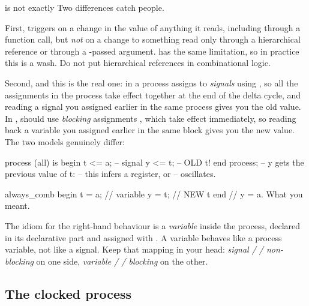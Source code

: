 \begin{gotcha}{ is not exactly }
Two differences catch people.

First,  triggers on a change in the value of anything it
reads, including through a function call, but \emph{not} on a change to
something read only through a hierarchical reference or through a
-passed argument.  has the same limitation, so in
practice this is a wash. Do not put hierarchical references in combinational
logic.

Second, and this is the real one: in \VHDL{} a process assigns to
\emph{signals} using \code{<=}, so all the assignments in the process take
effect together at the end of the delta cycle, and reading a signal you assigned
earlier in the same process gives you the old value. In \SV{},
 should use \emph{blocking} assignments \code{=}, which take
effect immediately, so reading back a variable you assigned earlier in the same
block gives you the new value. The two models genuinely differ:
\begin{rosetta}
\begin{rleft}
process (all) is
begin
  t <= a;      -- signal
  y <= t;      -- OLD t!
end process;
-- y gets the previous value of t:
-- this infers a register, or
-- oscillates.
\end{rleft}
\begin{rright}
always_comb begin
  t = a;       // variable
  y = t;       // NEW t
end
// y = a. What you meant.
\end{rright}
\end{rosetta}
The \VHDL{} idiom for the right-hand behaviour is a \emph{variable} inside the
process, declared in its declarative part and assigned with \code{:=}. A
\SV{}  variable behaves like a \VHDL{} process variable, not
like a \VHDL{} signal. Keep that mapping in your head:
\emph{signal / \code{<=} / non-blocking} on one side, \emph{variable /
\code{:=} / blocking} on the other.
\end{gotcha}

\subsection{The clocked process}

